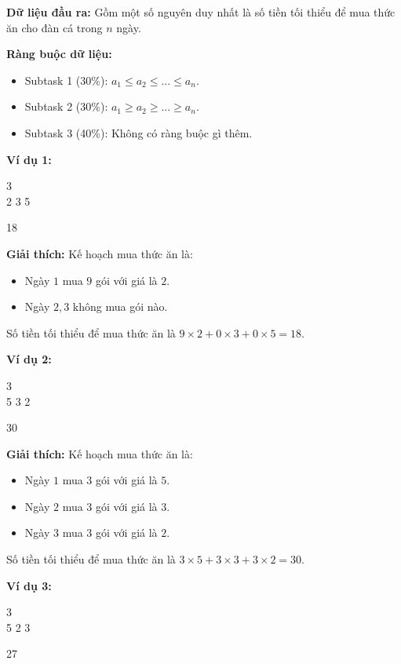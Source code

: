 \documentclass[12pt]{scrartcl}  %
\begin{document}
\textbf{Dữ liệu đầu ra:}
Gồm một số nguyên duy nhất là số tiền tối thiểu để mua thức ăn cho đàn cá trong $n$ ngày.

\textbf{Ràng buộc dữ liệu:}
\begin{itemize}
    \item Subtask 1 (30\%): $a_1 \leq a_2 \leq ... \leq a_n$.
    \item Subtask 2 (30\%): $a_1 \geq a_2 \geq ... \geq a_n$.
    \item Subtask 3 (40\%): Không có ràng buộc gì thêm.
\end{itemize}


\textbf{Ví dụ 1:}
\begin{tcolorbox}[colback=gray!5!white, colframe=blue!50!black, title=Input]
3\\
2 3 5
\end{tcolorbox}
\begin{tcolorbox}[colback=gray!5!white, colframe=green!50!black, title=Output]
18
\end{tcolorbox}

\textbf{Giải thích:}
Kế hoạch mua thức ăn là:
\begin{itemize}
    \item Ngày $1$ mua $9$ gói với giá là $2$.
    \item Ngày $2, 3$ không mua gói nào.
\end{itemize}
Số tiền tối thiểu để mua thức ăn là $9 \times 2 + 0 \times 3 + 0 \times 5 = 18$.

\textbf{Ví dụ 2:}
\begin{tcolorbox}[colback=gray!5!white, colframe=blue!50!black, title=Input]
3\\
5 3 2
\end{tcolorbox}
\begin{tcolorbox}[colback=gray!5!white, colframe=green!50!black, title=Output]
30
\end{tcolorbox}

\textbf{Giải thích:}
Kế hoạch mua thức ăn là:
\begin{itemize}
    \item Ngày $1$ mua $3$ gói với giá là $5$.
    \item Ngày $2$ mua $3$ gói với giá là $3$.
    \item Ngày $3$ mua $3$ gói với giá là $2$.
\end{itemize}
Số tiền tối thiểu để mua thức ăn là $3 \times 5 + 3 \times 3 + 3 \times 2 = 30$.

\textbf{Ví dụ 3:}
\begin{tcolorbox}[colback=gray!5!white, colframe=blue!50!black, title=Input]
3\\
5 2 3
\end{tcolorbox}
\begin{tcolorbox}[colback=gray!5!white, colframe=green!50!black, title=Output]
27
\end{tcolorbox}
\end{document}
